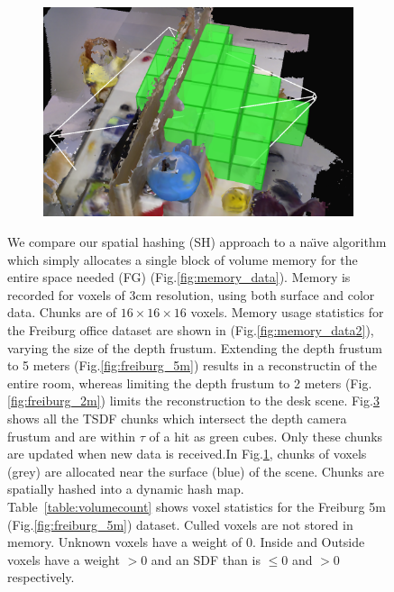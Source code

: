 \documentclass[conference]{IEEEtran}
\newcommand{\figref}[1]{Fig.\ref{#1}}
\newcommand{\tabref}[1]{Table~\ref{#1}}
\newcommand{\naive}{na\"{\i}ve }
\begin{document}
\begin{figure}
\begin{minipage}{0.45\linewidth}
\begin{subfigure}{0.45\linewidth}
 	      \caption{}
 	  	\label{fig:chunks} 
 	  \end{subfigure} 
 	  \begin{subfigure}{0.45\linewidth} \centering
	      \includegraphics[width=1.0\textwidth]{img/frustum_cull}
	      \caption{}
	 	 \label{fig:frustum_cull}
	  \end{subfigure}
   \end{minipage}
  \caption{ We compare our spatial hashing (SH)
      approach to a \naive algorithm which simply allocates a single
      block of volume memory for the entire space needed (FG)
      (\figref{fig:memory_data}). Memory is recorded for voxels of 3cm
      resolution, using both surface and color data. Chunks are of $16 \times 16 \times 16$ voxels. Memory
      usage statistics for the Freiburg \cite{FREIBURG} office dataset are shown
      in (\figref{fig:memory_data2}), varying the size of the depth frustum.
      Extending the depth frustum to 5 meters (\figref{fig:freiburg_5m}) results in a reconstructin of the entire
      room, whereas limiting the depth frustum to 2 meters
      (\figref{fig:freiburg_2m}) limits the reconstruction to the desk scene.
      \figref{fig:frustum_cull} shows all the TSDF chunks which intersect the
      depth camera frustum  and are within $\tau$ of a hit as green cubes. Only
      these chunks are updated when new data is received.In \figref{fig:chunks}, chunks of voxels (grey) are allocated near
  the surface (blue) of the scene. Chunks are spatially hashed \cite{SpatialHashing} into a
      dynamic hash map. \tabref{table:volumecount} shows voxel statistics for
      the Freiburg 5m (\figref{fig:freiburg_5m}) dataset. Culled voxels are not stored in
       memory. Unknown voxels have a weight of 0. Inside and Outside voxels have
      a weight $> 0$ and an SDF than is $\leq 0$ and $> 0$ respectively. }
\end{figure} 
\end{document}

